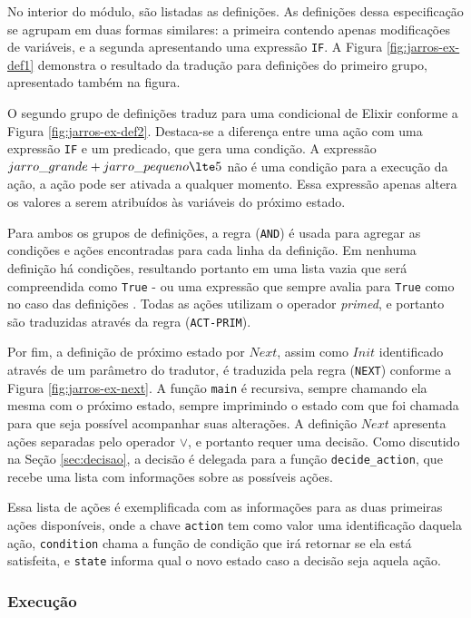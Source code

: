No interior do módulo, são listadas as definições. As definições dessa
especificação se agrupam em duas formas similares: a primeira contendo apenas
modificações de variáveis, e a segunda apresentando uma expressão \texttt{IF}. A
Figura \ref{fig:jarros-ex-def1} demonstra o resultado da tradução para
definições do primeiro grupo, apresentado também na figura.

O segundo grupo de definições traduz para uma condicional de Elixir conforme a
Figura \ref{fig:jarros-ex-def2}. Destaca-se a diferença entre uma ação com uma
expressão \texttt{IF} e um predicado, que gera uma condição. A expressão
$jarro\_grande + jarro\_pequeno \lte 5$ não é uma condição para a execução da
ação, a ação pode ser ativada a qualquer momento. Essa expressão apenas altera
os valores a serem atribuídos às variáveis do próximo estado.

Para ambos os grupos de definições, a regra (\texttt{AND}) é usada para agregar
as condições e ações encontradas para cada linha da definição. Em nenhuma
definição há condições, resultando portanto em uma lista vazia que será
compreendida como \texttt{True} - ou uma expressão que sempre avalia para
\texttt{True} como no caso das definições \IF. Todas as ações utilizam o operador
\textit{primed}, e portanto são traduzidas através da regra (\texttt{ACT-PRIM}).

Por fim, a definição de próximo estado por $Next$, assim como $Init$ identificado através
de um parâmetro do tradutor, é traduzida pela regra (\texttt{NEXT}) conforme a
Figura \ref{fig:jarros-ex-next}. A função \texttt{main} é recursiva, sempre
chamando ela mesma com o próximo estado, sempre imprimindo o estado com que foi
chamada para que seja possível acompanhar suas alterações. A definição $Next$
apresenta ações separadas pelo operador $\lor$, e portanto requer uma decisão.
Como discutido na Seção \ref{sec:decisao}, a decisão é delegada para a função
\texttt{decide\_action}, que recebe uma lista com informações sobre as possíveis
ações.

Essa lista de ações é exemplificada com as informações para as duas primeiras
ações disponíveis, onde a chave \texttt{action} tem como valor uma identificação
daquela ação, \texttt{condition} chama a função de condição que irá retornar se
ela está satisfeita, e \texttt{state} informa qual o novo estado caso a decisão
seja aquela ação.

\subsubsection{Execução}

